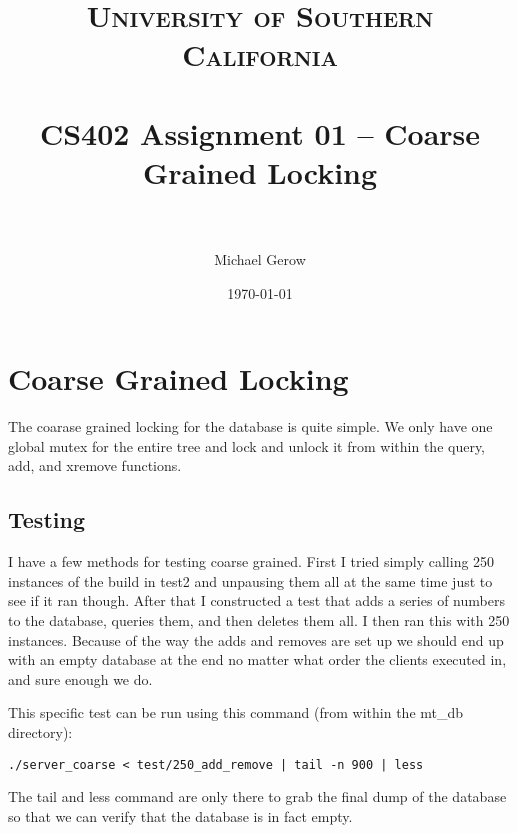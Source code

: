 \documentclass[paper=a4, fontsize=11pt]{scrartcl} %
\title{	
\normalfont \normalsize 
\textsc{University of Southern California} \\ [25pt] %
\horrule{0.5pt} \\[0.4cm] %
\huge CS402 Assignment 01 -- Coarse Grained Locking \\ %
\horrule{2pt} \\[0.5cm] %
}
\author{Michael Gerow} %
\date{\normalsize\today} %
\numberwithin{equation}{section} %
\numberwithin{figure}{section} %
\numberwithin{table}{section} %
\begin{document}
\maketitle %


\section{Coarse Grained Locking}
The coarase grained locking for the database is quite simple.  We only have one global mutex for the entire tree and lock and unlock it from within the query, add, and xremove functions.

\subsection{Testing}
I have a few methods for testing coarse grained.  First I tried simply calling 250 instances of the build in test2 and unpausing them all at the same time just to see if it ran though.  After that I constructed a test that adds a series of numbers to the database, queries them, and then deletes them all. I then ran this with 250 instances.  Because of the way the adds and removes are set up we should end up with an empty database at the end no matter what order the clients executed in, and sure enough we do.

This specific test can be run using this command (from within the mt\_db directory):

\begin{verbatim}
./server_coarse < test/250_add_remove | tail -n 900 | less
\end{verbatim}

The tail and less command are only there to grab the final dump of the database so that we can verify that the database is in fact empty.
\end{document}
